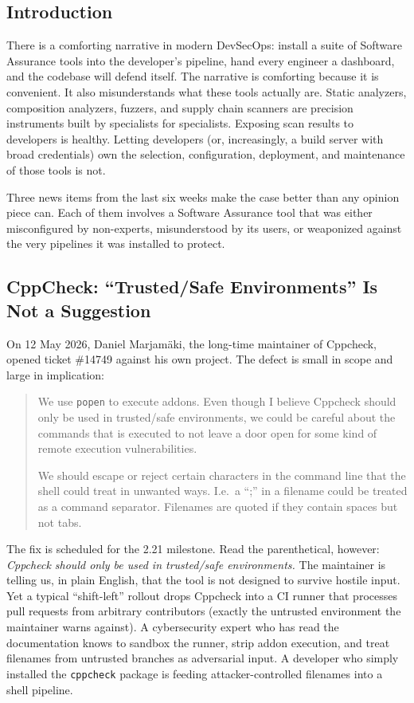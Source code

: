 \subsection{Introduction}

There is a comforting narrative in modern DevSecOps: install a suite of Software Assurance tools into the developer's pipeline, hand every engineer a dashboard, and the codebase will defend itself. The narrative is comforting because it is convenient. It also misunderstands what these tools actually are. Static analyzers, composition analyzers, fuzzers, and supply chain scanners are precision instruments built by specialists for specialists. Exposing scan results to developers is healthy. Letting developers (or, increasingly, a build server with broad credentials) own the selection, configuration, deployment, and maintenance of those tools is not.

Three news items from the last six weeks make the case better than any opinion piece can. Each of them involves a Software Assurance tool that was either misconfigured by non-experts, misunderstood by its users, or weaponized against the very pipelines it was installed to protect.

\subsection*{CppCheck: ``Trusted/Safe Environments'' Is Not a Suggestion}

On 12 May 2026, Daniel Marjam\"aki, the long-time maintainer of Cppcheck, opened ticket \#14749 against his own project. The defect is small in scope and large in implication:\autocite{20260525:cppcheck14749}

\begin{quote}
We use \texttt{popen} to execute addons. Even though I believe Cppcheck should only be used in trusted/safe environments, we could be careful about the commands that is executed to not leave a door open for some kind of remote execution vulnerabilities.

We should escape or reject certain characters in the command line that the shell could treat in unwanted ways. I.e.\ a ``;'' in a filename could be treated as a command separator. Filenames are quoted if they contain spaces but not tabs.
\end{quote}

The fix is scheduled for the 2.21 milestone. Read the parenthetical, however: \textit{Cppcheck should only be used in trusted/safe environments.} The maintainer is telling us, in plain English, that the tool is not designed to survive hostile input. Yet a typical ``shift-left'' rollout drops Cppcheck into a CI runner that processes pull requests from arbitrary contributors (exactly the untrusted environment the maintainer warns against). A cybersecurity expert who has read the documentation knows to sandbox the runner, strip addon execution, and treat filenames from untrusted branches as adversarial input. A developer who simply installed the \texttt{cppcheck} package is feeding attacker-controlled filenames into a shell pipeline.

